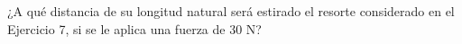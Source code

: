 \item ¿A qué distancia de su longitud natural será estirado el resorte considerado en el Ejercicio 7, si se le aplica una fuerza de $30 \text{ N}$?

